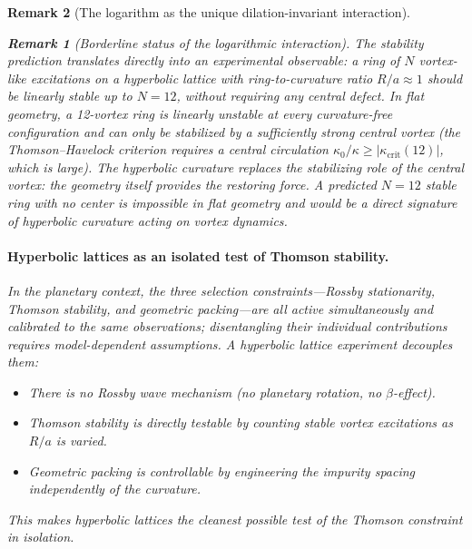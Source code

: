 \documentclass[12pt, a4paper]{article}
\newtheorem{remark}{Remark}[section]
\numberwithin{equation}{section}
\begin{document}
\begin{remark}[The logarithm as the unique dilation-invariant interaction]
\begin{remark}[Borderline status of the logarithmic interaction]
The stability prediction translates directly into an experimental
observable: \emph{a ring of $N$ vortex-like excitations on a
hyperbolic lattice with ring-to-curvature ratio $R/a \approx 1$
should be linearly stable up to $N = 12$, without requiring any
central defect}.  In flat geometry, a 12-vortex ring is linearly
unstable at every curvature-free configuration and can only be
stabilized by a sufficiently strong central vortex
(the Thomson--Havelock criterion requires a central circulation
$\kappa_0 / \kappa \ge |\kappa_{\mathrm{crit}}(12)|$, which is large).
The hyperbolic curvature replaces the stabilizing role of the
central vortex: the geometry itself provides the restoring force.
A predicted $N = 12$ stable ring with no center is impossible in
flat geometry and would be a direct signature of hyperbolic curvature
acting on vortex dynamics.

\paragraph{Hyperbolic lattices as an isolated test of Thomson stability.}
In the planetary context, the three selection constraints---Rossby
stationarity, Thomson stability, and geometric packing---are all
active simultaneously and calibrated to the same observations;
disentangling their individual contributions requires model-dependent
assumptions.  A hyperbolic lattice experiment decouples them:
\begin{itemize}
  \item There is \emph{no} Rossby wave mechanism (no planetary
    rotation, no $\beta$-effect).
  \item Thomson stability is directly testable by counting stable
    vortex excitations as $R/a$ is varied.
  \item Geometric packing is controllable by engineering the
    impurity spacing independently of the curvature.
\end{itemize}
This makes hyperbolic lattices the cleanest possible test of the
Thomson constraint \emph{in isolation}.


\end{remark}
\end{remark}
\end{document}
